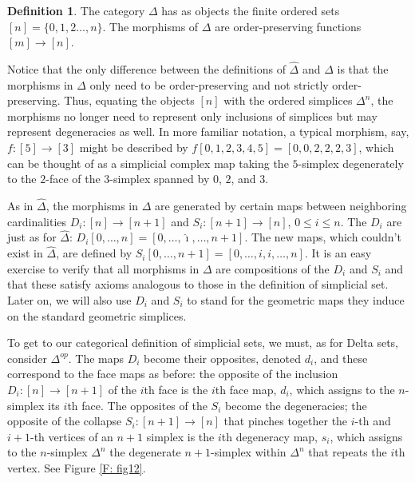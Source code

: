 \documentclass[12pt]{article}
\theoremstyle{plain}
\theoremstyle{definition}
\newtheorem{definition}[theorem]{Definition}
\begin{document}
\begin{definition} The category $\Delta$ has as  objects  the finite ordered sets $[n]=\{0,1,2\ldots, n\}$.  The morphisms of $\Delta$ are order-preserving functions $[m]\to [n]$.
\end{definition}

Notice that the only difference between the definitions of $\widehat \Delta$ and $\Delta$ is that the morphisms in $\Delta$ only need to be order-preserving and not strictly order-preserving. Thus, equating the objects $[n]$ with the ordered simplices $\Delta^n$, the morphisms no longer need to represent only inclusions of simplices but may represent degeneracies as well. In more familiar notation, a typical morphism, say,  $f\colon[5]\to [3]$ might be described by $f[0,1,2,3,4,5]=[0,0,2,2,2,3]$, which can be thought of as a simplicial complex map taking the $5$-simplex degenerately to the $2$-face of the $3$-simplex spanned by $0$, $2$, and $3$. 

As in $\widehat \Delta$, the morphisms in $\Delta$ are generated by certain maps between neighboring cardinalities $D_i\colon[n]\to [n+1]$ and $S_i\colon[n+1]\to [n]$, $0\leq i\leq n$. The $D_i$ are just as for $\widehat \Delta$: $D_i[0,\ldots, n]= [0,\ldots, \hat \imath,\ldots, n+1]$. The new maps, which couldn't exist in $\widehat \Delta$, are defined by $S_i[0,\ldots, n+1]= [0,\ldots, i, i,\ldots, n]$. It is an easy exercise to verify that all morphisms in $\Delta$ are compositions of the $D_i$ and $S_i$ and that these satisfy axioms analogous to those in the definition of simplicial set. Later on, we will also use $D_i$ and $S_i$ to stand for the geometric maps they induce on the  standard geometric simplices. 

To get to our categorical definition of simplicial sets, we must, as for Delta sets, consider $\Delta^{op}$. The maps $D_i$ become their opposites, denoted $d_i$, and these correspond to the face maps as before: the opposite of the inclusion $D_i\colon[n]\to [n+1]$ of the $i$th face is the $i$th face map, $d_i$, which assigns to the $n$-simplex its $i$th face. The opposites of the $S_i$ become the degeneracies; the opposite of the collapse  $S_i\colon[n+1]\to [n]$  that pinches together the  $i$-th and $i+1$-th vertices of an $n+1$ simplex is the $i$th degeneracy map, $s_i$, which assigns to the $n$-simplex $\Delta^n$ the degenerate $n+1$-simplex within $\Delta^{n}$ that repeats the  $i$th vertex. See Figure \ref{F: fig12}.
\end{document}
